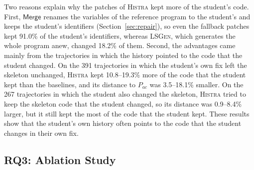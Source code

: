 \documentclass[10pt,conference]{IEEEtran}
\begin{document}
Two reasons explain why the patches of \textsc{Histra} kept more of the student's code. First, $\mathsf{Merge}$ renames the variables of the reference program to the student's and keeps the student's identifiers (Section~\ref{sec:repair}), so even the fallback patches kept 91.0\% of the student's identifiers, whereas \textsc{LSGen}, which generates the whole program anew, changed 18.2\% of them. Second, the advantages came mainly from the trajectories in which the history pointed to the code that the student changed. On the 391 trajectories in which the student's own fix left the skeleton unchanged, \textsc{Histra} kept 10.8--19.3\% more of the code that the student kept than the baselines, and its distance to $P_{\mathit{ac}}$ was 3.5--18.1\% smaller. On the 267 trajectories in which the student also changed the skeleton, \textsc{Histra} tried to keep the skeleton code that the student changed, so its distance was 0.9--8.4\% larger, but it still kept the most of the code that the student kept. These results show that the student's own history often points to the code that the student changes in their own fix.

\subsection{RQ3: Ablation Study}\label{sec:rq2}
\end{document}
